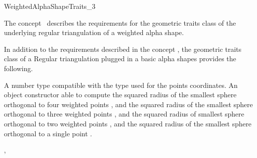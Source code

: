 

\begin{ccRefConcept}{WeightedAlphaShapeTraits_3}


\ccDefinition
  
The concept \ccRefName\ describes the requirements 
for the geometric traits class
of  the underlying  regular triangulation of a weighted alpha shape.

\ccRefines
{}

In addition to the requirements described in the concept 
,
the geometric traits class of a
Regular triangulation plugged in a basic alpha shapes
provides the following.

\ccTypes


 {A number type compatible with the type used for
  the points coordinates.}
{An object constructor able to compute the squared radius of the
 smallest sphere  orthogonal to  four weighted points ,
and the squared radius of the
smallest sphere  orthogonal to  three  weighted points ,
and the squared radius of smallest  sphere orthogonal to 
two weighted points ,
and the  squared radius  of the smallest sphere orthogonal to a single
point .} 

\ccCreation
{}  %


\ccAccessFunctions
{} {}


\ccHasModels

,

\end{ccRefConcept}


